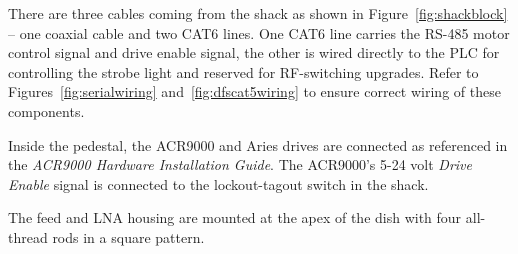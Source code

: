 \documentclass[titlepage]{article}
\begin{document}
There are three cables coming from the shack as shown in Figure~\ref{fig:shackblock} -- one coaxial cable and two CAT6 lines. One CAT6 line carries the RS-485 motor control signal and drive enable signal, the other is wired directly to the PLC for controlling the strobe light and reserved for RF-switching upgrades. Refer to Figures~\ref{fig:serialwiring} and~\ref{fig:dfscat5wiring} to ensure correct wiring of these components.

Inside the pedestal, the ACR9000 and Aries drives are connected as referenced in the \textit{ACR9000 Hardware Installation Guide}. The ACR9000's 5-24 volt \textit{Drive Enable} signal is connected to the lockout-tagout switch in the shack.

The feed and LNA housing are mounted at the apex of the dish with four all-thread rods in a square pattern.
\end{document}
